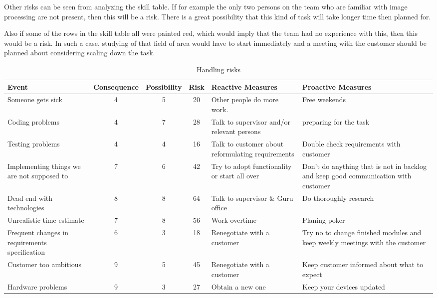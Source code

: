 Other risks can be seen from analyzing the skill table. If for example the only two persons on the team who are familiar with image processing are not present, then this will be a risk. There is a great possibility that this kind of task will take longer time then planned for. 

Also if some of the rows in the skill table all were painted red, which  would imply that the team had no experience with this, then this would be a risk. 
In such a case, studying of that field of area would have to start immediately and a meeting with the customer should be planned about considering scaling down the task.

\begin{table}
    \caption{Handling risks}
    \label{tab:risks}
    
    \centering {}
    \vspace{2mm} %
    \begin{tabularx}{500pt}{XcccXX}
    \toprule[0.5mm]
        Event & Consequence & Possibility & Risk  & Reactive Measures & Proactive Measures \\
    \midrule
Someone gets sick & 4     & 5     & 20    & Other people do more work.  & Free weekends \\
Coding problems & 4     & 7     & 28    & Talk to supervisor and/or relevant persons & preparing for the task \\
Testing problems & 4     & 4     & 16    & Talk to customer about reformulating requirements & Double check requirements with customer \\
Implementing things we are not supposed to & 7     & 6     & 42    & Try to adopt functionality or start all over & Don't do anything that is not in backlog and keep good communication with customer \\
Dead end with technologies & 8     & 8     & 64    & Talk to supervisor \& Guru office & Do thoroughly research \\
Unrealistic time estimate & 7     & 8     & 56    & Work overtime  & Planing poker \\
Frequent changes in requirements specification & 6     & 3     & 18    & Renegotiate with a customer & Try no to change finished modules and keep weekly meetings with the customer \\
Customer too ambitious & 9     & 5     & 45    & Renegotiate with a customer & Keep customer informed about what  to expect \\
Hardware problems & 9     & 3     & 27    & Obtain a new one & Keep your devices updated \\
\bottomrule[0.5mm]
\end{tabularx}
\end{table}

